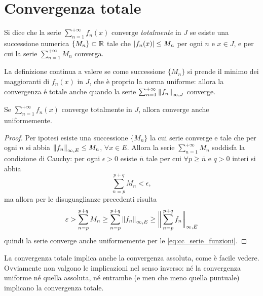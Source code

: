 \section{Convergenza totale}
\begin{definizione}
Si dice che la serie $\sum_{n=1}^{+\infty}f_n(x)$ converge \emph{totalmente} in $J$ se esiste una successione numerica $\{M_n\}\subset\mathbb{R}$ tale che $\left|{f_n(x)}\right|\leq M_n$ per ogni $n$ e $x\in J$, e per cui la serie $\sum_{n=1}^{+\infty}M_n$ converga.
\end{definizione}
La definizione continua a valere se come successione $\{M_n\}$ si prende il minimo dei maggioranti di $f_n(x)$ in $J$, che è proprio la norma uniforme: allora la convergenza é totale anche quando la serie $\sum_{n=1}^{+\infty}\left\|{f_n}\right\|_{\infty,J}$ converge.
\begin{teorema}[di Weierstrass]
Se $\sum_{n=1}^{+\infty}f_n(x)$ converge totalmente in $J$, allora converge anche uniformemente.
\end{teorema}
\begin{proof}
Per ipotesi esiste una successione $\{M_n\}$ la cui serie converge e tale che per ogni $n$ si abbia $\left\|{f_n}\right\|_{\infty,E}\leq M_n$, $\forall x\in E$. Allora la serie $\sum_{n=1}^{+\infty}M_n$ soddisfa la condizione di Cauchy: per ogni $\epsilon>0$ esiste $\overline{n}$ tale per cui $\forall p\geq\overline{n}$ e $q>0$ interi si abbia
\[
\sum_{n=p}^{p+q}M_n<\epsilon,
\]
ma allora per le disuguaglianze precedenti risulta
\[
\varepsilon>\sum_{n=p}^{p+q}M_n\geq\sum_{n=p}^{p+q}\left\|{f_n}\right\|_{\infty,E}\geq\bigg\|\sum_{n=p}^{p+q}f_n\bigg\|_{\infty,E}
\]
quindi la serie converge anche uniformemente per le \eqref{eq:cc_serie_funzioni}.
\end{proof}
La convergenza totale implica anche la convergenza assoluta, come è facile vedere. Ovviamente non valgono le implicazioni nel senso inverso: né la convergenza uniforme né quella assoluta, né entrambe (e men che meno quella puntuale) implicano la convergenza totale.
